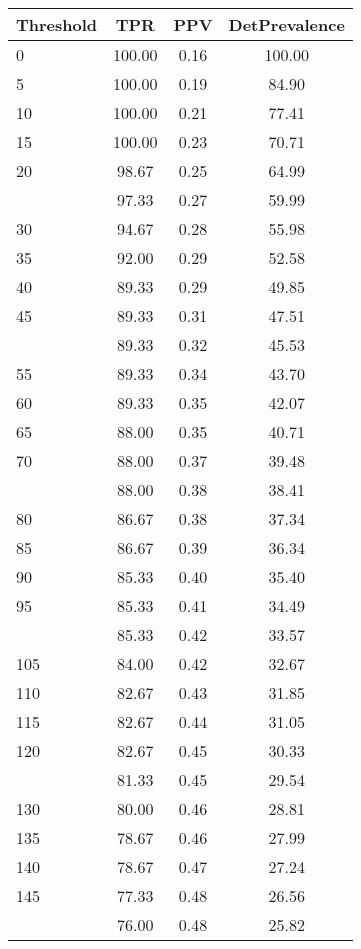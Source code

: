 \begin{table}[ht]
\centering
\begin{tabular}{lccc}
  \toprule
Threshold & TPR & PPV & DetPrevalence \\ 
  \midrule
0 & 100.00 & 0.16 & 100.00 \\ 
  5 & 100.00 & 0.19 & 84.90 \\ 
  10 & 100.00 & 0.21 & 77.41 \\ 
  15 & 100.00 & 0.23 & 70.71 \\ 
  20 & 98.67 & 0.25 & 64.99 \\ 
   \addlinespace
25 & 97.33 & 0.27 & 59.99 \\ 
  30 & 94.67 & 0.28 & 55.98 \\ 
  35 & 92.00 & 0.29 & 52.58 \\ 
  40 & 89.33 & 0.29 & 49.85 \\ 
  45 & 89.33 & 0.31 & 47.51 \\ 
   \addlinespace
50 & 89.33 & 0.32 & 45.53 \\ 
  55 & 89.33 & 0.34 & 43.70 \\ 
  60 & 89.33 & 0.35 & 42.07 \\ 
  65 & 88.00 & 0.35 & 40.71 \\ 
  70 & 88.00 & 0.37 & 39.48 \\ 
   \addlinespace
75 & 88.00 & 0.38 & 38.41 \\ 
  80 & 86.67 & 0.38 & 37.34 \\ 
  85 & 86.67 & 0.39 & 36.34 \\ 
  90 & 85.33 & 0.40 & 35.40 \\ 
  95 & 85.33 & 0.41 & 34.49 \\ 
   \addlinespace
100 & 85.33 & 0.42 & 33.57 \\ 
  105 & 84.00 & 0.42 & 32.67 \\ 
  110 & 82.67 & 0.43 & 31.85 \\ 
  115 & 82.67 & 0.44 & 31.05 \\ 
  120 & 82.67 & 0.45 & 30.33 \\ 
   \addlinespace
125 & 81.33 & 0.45 & 29.54 \\ 
  130 & 80.00 & 0.46 & 28.81 \\ 
  135 & 78.67 & 0.46 & 27.99 \\ 
  140 & 78.67 & 0.47 & 27.24 \\ 
  145 & 77.33 & 0.48 & 26.56 \\ 
   \addlinespace
150 & 76.00 & 0.48 & 25.82 \\ 

\end{tabular}
\end{table}
